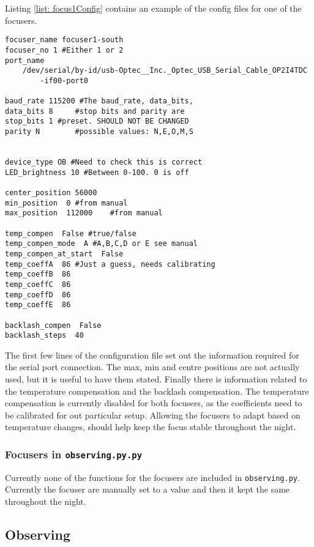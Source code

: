 \documentclass[a4paper,12pt]{article}
\newcommand{\observing}{\tt{observing.py}}
\begin{document}
Listing \ref{list: focus1Config} contains an example of the config files for one of the focusers.
\begin{lstlisting}[caption={Example configuration file for South focuser}, label={list: focus1Config}]
focuser_name focuser1-south
focuser_no 1 #Either 1 or 2
port_name 
	/dev/serial/by-id/usb-Optec__Inc._Optec_USB_Serial_Cable_OP2I4TDC
		-if00-port0

baud_rate 115200 #The baud_rate, data_bits,
data_bits 8     #stop bits and parity are
stop_bits 1 #preset. SHOULD NOT BE CHANGED
parity N        #possible values: N,E,O,M,S


device_type OB #Need to check this is correct
LED_brightness 10 #Between 0-100. 0 is off

center_position 56000
min_position  0 #from manual
max_position  112000    #from manual

temp_compen  False #true/false
temp_compen_mode  A #A,B,C,D or E see manual
temp_compen_at_start  False
temp_coeffA  86 #Just a guess, needs calibrating
temp_coeffB  86
temp_coeffC  86
temp_coeffD  86
temp_coeffE  86

backlash_compen  False
backlash_steps  40
\end{lstlisting}

The first few lines of the configuration file set out the information required for the serial port connection. The max, min and centre positions are not actually used, but it is useful to have them stated. Finally there is information related to the temperature compensation and the backlash compensation. The temperature compensation is currently disabled for both focusers, as the coefficients need to be calibrated for out particular setup. Allowing the focusers to adapt based on temperature changes, should help keep the focus stable throughout the night.

\subsubsection{Focusers in {\observing.py}}

Currently none of the functions for the focusers are included in {\observing}. Currently the focuser are manually set to a value and then it kept the same throughout the night. 


\subsection{Observing}
\label{sec:observing}
\end{document}
